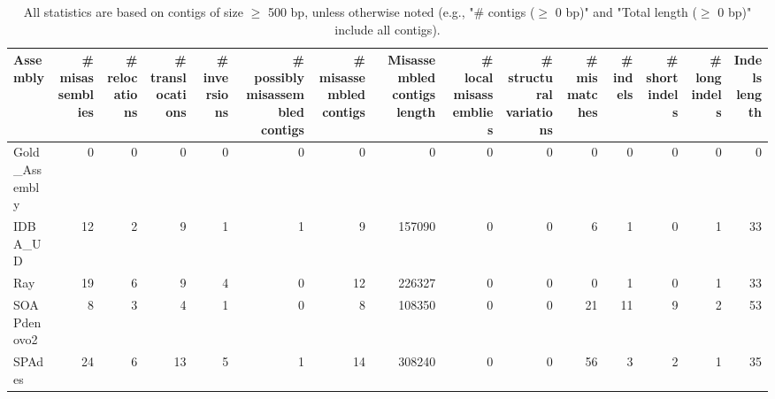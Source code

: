 \documentclass[12pt,a4paper]{article}
\begin{document}
\begin{table}[ht]
\begin{center}
\caption{All statistics are based on contigs of size $\geq$ 500 bp, unless otherwise noted (e.g., "\# contigs ($\geq$ 0 bp)" and "Total length ($\geq$ 0 bp)" include all contigs).}
\begin{tabular}{|l*{14}{|r}|}
\hline
Assembly & \# misassemblies &     \# relocations &     \# translocations &     \# inversions & \# possibly misassembled contigs & \# misassembled contigs & Misassembled contigs length & \# local misassemblies & \# structural variations & \# mismatches & \# indels &     \# short indels &     \# long indels & Indels length \\ \hline
Gold\_Assembly & 0 & 0 & 0 & 0 & 0 & 0 & 0 & 0 & 0 & 0 & 0 & 0 & 0 & 0 \\ \hline
IDBA\_UD & 12 & 2 & 9 & 1 & 1 & 9 & 157090 & 0 & 0 & 6 & 1 & 0 & 1 & 33 \\ \hline
Ray & 19 & 6 & 9 & 4 & 0 & 12 & 226327 & 0 & 0 & 0 & 1 & 0 & 1 & 33 \\ \hline
SOAPdenovo2 & 8 & 3 & 4 & 1 & 0 & 8 & 108350 & 0 & 0 & 21 & 11 & 9 & 2 & 53 \\ \hline
SPAdes & 24 & 6 & 13 & 5 & 1 & 14 & 308240 & 0 & 0 & 56 & 3 & 2 & 1 & 35 \\ \hline
\end{tabular}
\end{center}
\end{table}
\end{document}
